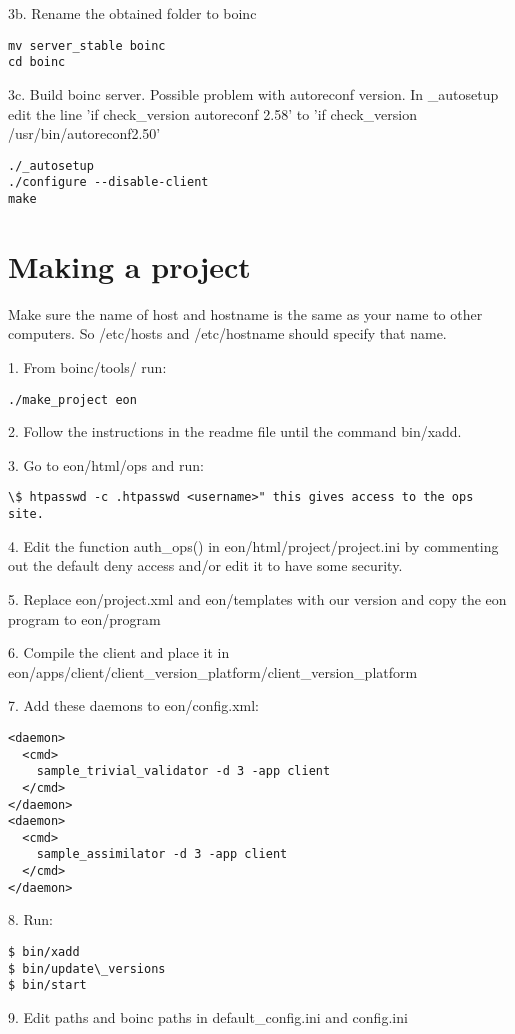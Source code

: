 \documentclass{article}
\begin{document}
3b. Rename the obtained folder to boinc
\begin{verbatim}
mv server_stable boinc
cd boinc
\end{verbatim}

3c. Build boinc server. Possible problem with autoreconf version. In \_autosetup edit the line 'if check\_version autoreconf 2.58' to 'if check\_version /usr/bin/autoreconf2.50'
\begin{verbatim}
./_autosetup   
./configure --disable-client
make 
\end{verbatim}


\section{Making a project}

Make sure the name of host and hostname is the same as your name to other computers. So /etc/hosts and /etc/hostname should specify that name.

1. From boinc/tools/ run:
\begin{verbatim}
./make_project eon 
\end{verbatim}

2. Follow the instructions in the readme file until the command bin/xadd.

3. Go to eon/html/ops and run:
\begin{verbatim}
\$ htpasswd -c .htpasswd <username>" this gives access to the ops site.
\end{verbatim}

4. Edit the function auth\_ops() in eon/html/project/project.ini by commenting out the default deny access and/or edit it to have some security.

5. Replace eon/project.xml and eon/templates with our version and copy the eon program to eon/program

6. Compile the client and place it in eon/apps/client/client\_version\_platform/client\_version\_platform

7. Add these daemons to eon/config.xml:
\begin{verbatim}
<daemon>
  <cmd>
    sample_trivial_validator -d 3 -app client
  </cmd>
</daemon>
<daemon>
  <cmd>
    sample_assimilator -d 3 -app client
  </cmd>
</daemon> 
\end{verbatim}

8. Run:
\begin{verbatim}
$ bin/xadd
$ bin/update\_versions
$ bin/start
\end{verbatim}

9. Edit paths and boinc paths in default\_config.ini and config.ini
\end{document}
